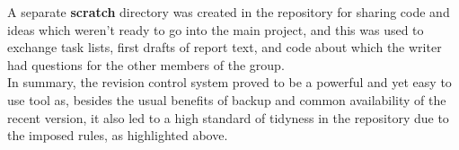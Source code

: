 A separate \textbf{scratch} directory was created in the repository for sharing code and ideas which weren't ready to go into the main project, and this was used to exchange task lists, first drafts of report text, and code about which the writer had questions for the other members of the group.\\

In summary, the revision control system proved to be a powerful and yet easy to use tool as, besides the usual benefits of backup and common availability of the recent version, it also led to a high standard of tidyness in the repository due to the imposed rules, as highlighted above.
